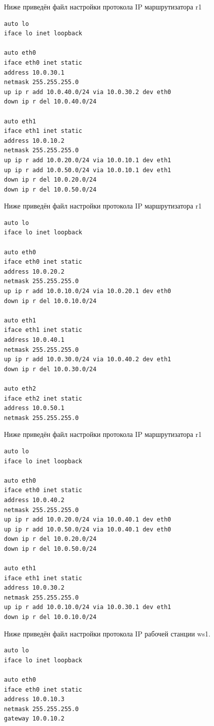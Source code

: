 \documentclass[a4paper,12pt]{article}
\begin{document}
Ниже приведён файл настройки протокола IP маршрутизатора r1

\begin{Verbatim}
auto lo
iface lo inet loopback

auto eth0
iface eth0 inet static
address 10.0.30.1
netmask 255.255.255.0
up ip r add 10.0.40.0/24 via 10.0.30.2 dev eth0
down ip r del 10.0.40.0/24

auto eth1
iface eth1 inet static
address 10.0.10.2
netmask 255.255.255.0
up ip r add 10.0.20.0/24 via 10.0.10.1 dev eth1
up ip r add 10.0.50.0/24 via 10.0.10.1 dev eth1
down ip r del 10.0.20.0/24
down ip r del 10.0.50.0/24
\end{Verbatim}

Ниже приведён файл настройки протокола IP маршрутизатора r1

\begin{Verbatim}
auto lo
iface lo inet loopback

auto eth0
iface eth0 inet static
address 10.0.20.2
netmask 255.255.255.0
up ip r add 10.0.10.0/24 via 10.0.20.1 dev eth0
down ip r del 10.0.10.0/24

auto eth1
iface eth1 inet static
address 10.0.40.1
netmask 255.255.255.0
up ip r add 10.0.30.0/24 via 10.0.40.2 dev eth1
down ip r del 10.0.30.0/24

auto eth2
iface eth2 inet static
address 10.0.50.1
netmask 255.255.255.0
\end{Verbatim}

Ниже приведён файл настройки протокола IP маршрутизатора r1

\begin{Verbatim}
auto lo
iface lo inet loopback

auto eth0
iface eth0 inet static
address 10.0.40.2
netmask 255.255.255.0
up ip r add 10.0.20.0/24 via 10.0.40.1 dev eth0
up ip r add 10.0.50.0/24 via 10.0.40.1 dev eth0
down ip r del 10.0.20.0/24
down ip r del 10.0.50.0/24

auto eth1
iface eth1 inet static
address 10.0.30.2
netmask 255.255.255.0
up ip r add 10.0.10.0/24 via 10.0.30.1 dev eth1
down ip r del 10.0.10.0/24
\end{Verbatim}

Ниже приведён файл настройки протокола IP рабочей станции ws1.

\begin{Verbatim}
auto lo
iface lo inet loopback

auto eth0
iface eth0 inet static
address 10.0.10.3
netmask 255.255.255.0
gateway 10.0.10.2
\end{Verbatim}
\end{document}
